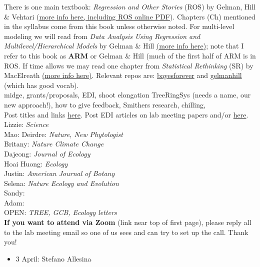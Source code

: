 \documentclass[11pt]{article}
\newenvironment{smitemize}{
\begin{itemize}
  \setlength{\itemsep}{0pt}
  \setlength{\parskip}{0.8pt}
  \setlength{\parsep}{0pt}}
{\end{itemize}
}
\begin{document}
There is one main textbook: \emph{Regression and Other Stories} (ROS) by Gelman, Hill \& Vehtari (\href{https://avehtari.github.io/ROS-Examples/}{more info here, including ROS online PDF}). Chapters (Ch) mentioned in the syllabus come from this book unless otherwise noted. For multi-level modeling we will read from \emph{Data Analysis Using Regression and Multilevel/Hierarchical Models} by Gelman \& Hill \href{http://www.stat.columbia.edu/~gelman/arm/}{(more info here)}; note that I refer to this book as {\bf ARM} or Gelman \& Hill (much of the first half of ARM is in ROS. If time allows we may read one chapter from \emph{Statistical Rethinking} (SR) by MacElreath \href{http://xcelab.net/rm/statistical-rethinking/}{(more info here)}. Relevant repos are: \href{https://github.com/temporalecologylab/bayesforever}{bayesforever} and \href{https://github.com/lizzieinvancouver/gelmanhill}{gelmanhill} (which has good vocab). \\
\vspace{6pt}
 midge, grants/proposals, EDI, shoot elongation TreeRingSys (needs a name, our new approach!), how to give feedback, Smithers research, chilling, \\
\vspace{7pt}
 Post titles and links \href{https://docs.google.com/document/d/1j0WdDbjdp8ERLSO7whvtnP-tOblYMlX33TSCXy_uRKo/edit?usp=sharing}{\underline{here}}. Post EDI articles on lab meeting papers and/or  \href{https://docs.google.com/document/d/18VbP-03oD0BsArxYm60g1ZvvFL7IoA3-6rpdHb1eLPw/edit#heading=h.gsqcglkhxkzg}{here}.\\

Lizzie: \emph{Science}\\
Mao:
Deirdre: \emph{Nature, New Phytologist}\\
Britany: \emph{Nature Climate Change}\\
Dajeong: \emph{Journal of Ecology}\\
Hoai Huong: \emph{Ecology}\\
Justin: \emph{American Journal of Botany}\\
Selena: \emph{Nature Ecology and Evolution}\\
Sandy: \\
Adam: \\

OPEN: \emph{TREE, GCB, Ecology letters}\\

{\bf If you want to attend via Zoom} (link near top of first page), please reply all to the lab meeting email so one of us sees and can try to set up the call. Thank you!

\vspace{6pt}
\vspace{-1ex}
\begin{smitemize}
\item 3 April: Stefano Allesina
\end{smitemize}
\end{document}
